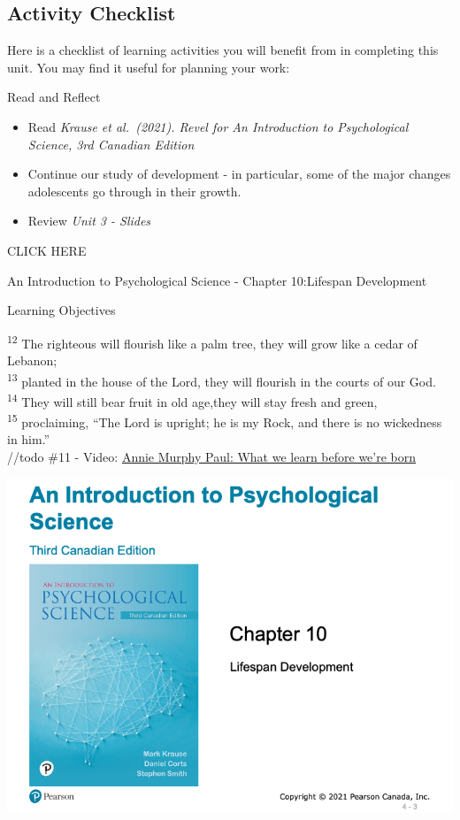 \documentclass[
]{book}
\providecommand{\tightlist}{%
  \setlength{\itemsep}{0pt}\setlength{\parskip}{0pt}}
\begin{document}
\hypertarget{activity-checklist-2}{%
\subsection*{Activity Checklist}\label{activity-checklist-2}}

Here is a checklist of learning activities you will benefit from in completing this unit. You may find it useful for planning your work:

\begin{reflect}
{Read and Reflect}

\begin{itemize}
\tightlist
\item
  Read \emph{Krause et al.~(2021). Revel for An Introduction to Psychological Science, 3rd Canadian Edition}\\
\item
  Continue our study of development - in particular, some of the major changes adolescents go through in their growth.\\
\item
  Review \emph{Unit 3 - Slides}
\end{itemize}

CLICK HERE

An Introduction to Psychological Science - Chapter 10:Lifespan Development

Learning Objectives

\textsuperscript{12} The righteous will flourish like a palm tree, they will grow like a cedar of Lebanon;\\
\textsuperscript{13} planted in the house of the Lord, they will flourish in the courts of our God.\\
\textsuperscript{14} They will still bear fruit in old age,they will stay fresh and green,\\
\textsuperscript{15} proclaiming, ``The Lord is upright; he is my Rock, and there is no wickedness in him.''\\
//todo \#11
- Video: \href{http://www.ted.com/talks/annie_murphy_paul_what_we_learn_before_we_re_born.html}{Annie Murphy Paul: What we learn before we're born}

\includegraphics{assets/unit_3/slide_3.png}


\end{reflect}
\end{document}
